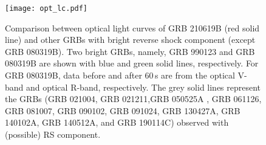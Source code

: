 \documentclass{naturesubmissionstyle}
\begin{document}
\newpage 

\begin{figure}
    \centering
    \texttt{[image: opt\_lc.pdf]}
    \caption{Comparison between optical light curves of GRB 210619B (red solid line) and other GRBs with bright reverse shock component (except GRB 080319B). Two bright GRBs, namely, GRB 990123\cite{Akerlof1999} and GRB 080319B\cite{Racusin2008} are shown with blue and green solid lines, respectively. For GRB 080319B, data before and after 60\,s are from the optical V-band and optical R-band, respectively. The grey solid lines represent the GRBs (GRB 021004\cite{021004}, GRB 021211\cite{021211},GRB 050525A \cite{050525A}, GRB 061126\cite{061126}, GRB 081007\cite{081007}, GRB 090102\cite{090102}, GRB 091024\cite{091024,gcn_10066,gcn_10073,gcn_10074}, GRB 130427A\cite{130427A}, GRB 140102A\cite{140102A}, GRB 140512A\cite{140512A}, and GRB 190114C\cite{190114C}) observed with (possible) RS component.}
    \label{fig:all_RS}
\end{figure}

\newpage 




\clearpage

\end{document}

